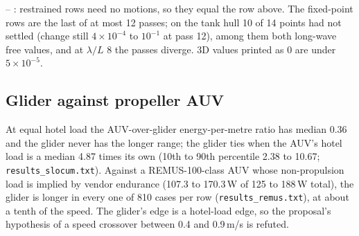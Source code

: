 \documentclass[conference]{IEEEtran}
\begin{document}
\begin{table}[t]
\centering
\caption{The strip near field's sectional diffraction flow against the three-dimensional panel near field (Capytaine, 80$\times$16 panels per half), zero speed, head waves, each row adding one term of the 3D body condition to each section's. Area: near-field added resistance integrated over $\lambda/L$ 0.5 to 2.0 (trapezoid) over the 3D's. WL$_1$, ID$_1$: the waterline term and the velocity term's incident--disturbance cross term at $\lambda/L$ 1; NF$_4$, NF$_8$: the free near field at $\lambda/L$ 4 and 8; all in $\rho g\zeta_a^2B^2/L$. Free rows use the strip motions (from the relative-motion exciting force unless stated). Generated by \texttt{make\_table\_sectional.py} from the three results files named in the text, with every area recomputed from the rows and checked against the runs' printed summaries.}
\label{tab:sectional}
\small


\smallskip
{\footnotesize -- : restrained rows need no motions, so they equal the row above. The fixed-point rows are the last of at most 12 passes; on the tank hull 10 of 14 points had not settled (change still $4\times10^{-4}$ to $10^{-1}$ at pass 12), among them both long-wave free values, and at $\lambda/L$ 8 the passes diverge. 3D values printed as 0 are under $5\times10^{-5}$.}
\end{table}

\subsection{Glider against propeller AUV}
At equal hotel load the AUV-over-glider energy-per-metre ratio has median 0.36 and the glider never
has the longer range; the glider ties when the AUV's hotel load is a median 4.87 times its own
(10th to 90th percentile 2.38 to 10.67; \texttt{results\_slocum.txt}). Against a REMUS-100-class
AUV whose non-propulsion load is implied by vendor endurance (107.3 to 170.3\,W of 125 to 188\,W
total), the glider is longer in every one of 810 cases per row (\texttt{results\_remus.txt}), at
about a tenth of the speed. The glider's edge is a hotel-load edge, so the proposal's hypothesis of
a speed crossover between 0.4 and 0.9\,m/s is refuted.
\end{document}
